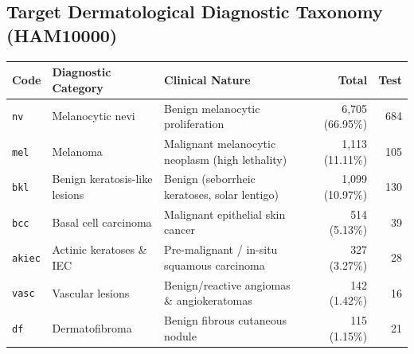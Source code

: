 \documentclass[12pt,a4paper]{article}
\begin{document}
\subsection{Target Dermatological Diagnostic Taxonomy (HAM10000)}
\begin{table}[h!]
\centering
\renewcommand{\arraystretch}{1.2}
\begin{tabularx}{\textwidth}{l l X r r}
\toprule
\textbf{Code} & \textbf{Diagnostic Category} & \textbf{Clinical Nature} & \textbf{Total} & \textbf{Test} \\
\midrule
\texttt{nv} & Melanocytic nevi & Benign melanocytic proliferation & 6,705 (66.95\%) & 684 \\
\texttt{mel} & Melanoma & Malignant melanocytic neoplasm (high lethality) & 1,113 (11.11\%) & 105 \\
\texttt{bkl} & Benign keratosis-like lesions & Benign (seborrheic keratoses, solar lentigo) & 1,099 (10.97\%) & 130 \\
\texttt{bcc} & Basal cell carcinoma & Malignant epithelial skin cancer & 514 (5.13\%) & 39 \\
\texttt{akiec} & Actinic keratoses \& IEC & Pre-malignant / in-situ squamous carcinoma & 327 (3.27\%) & 28 \\
\texttt{vasc} & Vascular lesions & Benign/reactive angiomas \& angiokeratomas & 142 (1.42\%) & 16 \\
\texttt{df} & Dermatofibroma & Benign fibrous cutaneous nodule & 115 (1.15\%) & 21 \\
\bottomrule
\end{tabularx}
\end{table}
\end{document}
